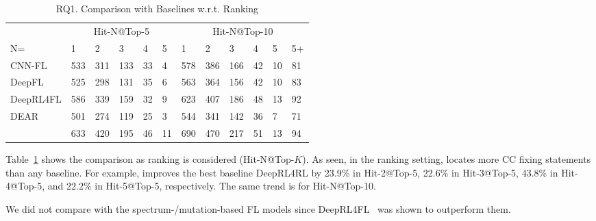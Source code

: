 \begin{table}[t]
	\caption{RQ1. Comparison with Baselines w.r.t. Ranking}
        \vspace{-9pt}
	{\small
		\begin{center}
			\renewcommand{\arraystretch}{1}
			\begin{tabular}{p{1.3cm}<{\centering}|p{0.3cm}<{\centering}|p{0.3cm}<{\centering}|p{0.3cm}<{\centering}|p{0.2cm}<{\centering}|p{0.2cm}<{\centering}||p{0.3cm}<{\centering}|p{0.3cm}<{\centering}|p{0.3cm}<{\centering}|p{0.2cm}<{\centering}|p{0.2cm}<{\centering}|p{0.2cm}<{\centering}}
				\hline
				    & \multicolumn{5}{c||}{Hit-N@Top-5}& \multicolumn{6}{c}{Hit-N@Top-10}\\
				\cline{2-12} N= 
											 &1&2&3&4&5&1&2&3&4&5&5+\\
				
				\hline
				CNN-FL      & 533 & 311 & 133 & 33 & 4 & 578 & 386 & 166 & 42 & 10 & 81 \\
				DeepFL		& 525 & 298 & 131 & 35 & 6 & 563 & 364 & 156 & 42 & 10 & 83 \\
				DeepRL4FL	& 586 & 339 & 159 & 32 & 9 & 623 & 407 & 186 & 48 & 13 & 92 \\
                                DEAR	& 501 & 274 & 119 & 25 & 3 & 544 & 341 & 142 & 36 & 7 & 71 \\
				\hline
				\tool       & 633 & 420 & 195 & 46 & 11& 690 & 470 & 217 & 51 & 13 & 94 \\
				\hline
			\end{tabular}
			
			\label{fig:rq1-rank}
		\end{center}
	}
\end{table}

Table~\ref{fig:rq1-rank} shows the comparison as ranking is considered
(Hit-N@Top-$K$).  As seen,
in the ranking setting, {\tool} locates more CC fixing
statements than any baseline.
For example, {\tool} improves the best baseline DeepRL4RL
by 23.9\% in Hit-2@Top-5, 22.6\% in Hit-3@Top-5, 43.8\% in
Hit-4@Top-5, and 22.2\% in Hit-5@Top-5, respectively. The same trend
is for Hit-N@Top-10.


We did not compare with the spectrum-/mutation-based FL
models since DeepRL4FL~\cite{icse21-fl} was shown to outperform
them.

